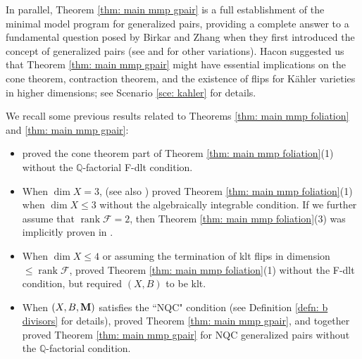 \documentclass[11pt]{amsart}
\numberwithin{equation}{section}
\newcommand{\Mm}{{\bf{M}}}
\newcommand{\Qq}{\mathbb{Q}}
\newcommand{\rk}{\operatorname{rank}}
\newcommand{\Ff}{\mathcal{F}}
\theoremstyle{definition}
\theoremstyle{definition}
\theoremstyle{definition}
\begin{document}
In parallel, Theorem \ref{thm: main mmp gpair} is a full establishment of the minimal model program for generalized pairs, providing a complete answer to a fundamental question posed by Birkar and Zhang when they first introduced the concept of generalized pairs \cite[Before Lemma 4.4]{BZ16} (see \cite[6.1]{Bir21} and \cite[3.1, 3.3]{HL22} for other variations). Hacon suggested us that Theorem \ref{thm: main mmp gpair} might have essential implications on the cone theorem, contraction theorem, and the existence of flips for K\"ahler varieties in higher dimensions; see Scenario \ref{sce: kahler} for details.

We recall some previous results related to Theorems \ref{thm: main mmp foliation} and \ref{thm: main mmp gpair}:
\begin{itemize}
    \item \cite{ACSS21} proved the cone theorem part of Theorem \ref{thm: main mmp foliation}(1) without the $\Qq$-factorial F-dlt condition.
    \item When $\dim X=3$, \cite{CS20,CS21} (see also \cite{SS22}) proved Theorem \ref{thm: main mmp foliation}(1) when $\dim X\leq 3$ without the algebraically integrable condition. If we further assume that $\rk\Ff=2$, then Theorem \ref{thm: main mmp foliation}(3) was implicitly proven in \cite[Proof of Theorem 2.6]{SS22}.
    \item When $\dim X\leq 4$ or assuming the termination of klt flips in dimension $\leq\rk\Ff$, \cite{CS23a} proved Theorem \ref{thm: main mmp foliation}(1) without the F-dlt condition, but required $(X,B)$ to be klt.
    \item When $(X,B,\Mm)$ satisfies the ``NQC" condition (see Definition \ref{defn: b divisors} for details), \cite{HL21a} proved Theorem \ref{thm: main mmp gpair}, and \cite{HL21a,Xie22,CLX23,LX23b} together proved Theorem \ref{thm: main mmp gpair} for NQC generalized pairs without the $\Qq$-factorial condition.
\end{itemize}
\end{document}
